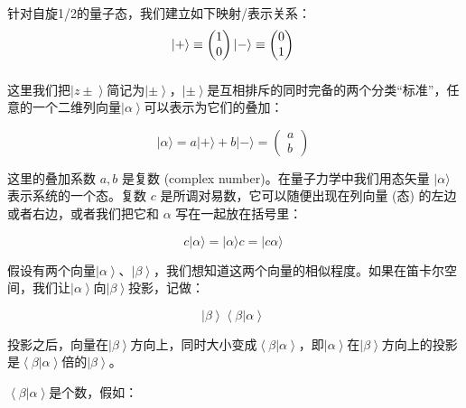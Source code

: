针对自旋1/2的量子态，我们建立如下映射/表示关系：
\begin{equation}
|+\rangle \equiv \begin{pmatrix}1 \\ 0 
\end{pmatrix}\qquad \\\\ 
|-\rangle \equiv \begin{pmatrix}0\\1
\end{pmatrix}~
\end{equation}
\begin{equation}
\end{equation}

这里我们把$\left| z \pm \right\rangle$简记为$\left| \pm \right\rangle$，$\left| \pm \right\rangle$是互相排斥的同时完备的两个分类“标准”，任意的一个二维列向量$\left| \alpha \right\rangle$可以表示为它们的叠加：

\begin{equation}
|\alpha\rangle = a|+\rangle + b|-\rangle = \begin{pmatrix}
a \\ b \end{pmatrix}~
\end{equation}

这里的叠加系数 $a, b$ 是复数 (complex number)。在量子力学中我们用态矢量 $|\alpha\rangle$ 表示系统的一个态。复数 $c$ 是所调对易数，它可以随便出现在列向量 (态) 的左边或者右边，或者我们把它和 $\alpha$ 写在一起放在括号里：

\begin{equation}
c|\alpha\rangle = |\alpha\rangle c = |c\alpha\rangle~
\end{equation}

假设有两个向量$\left|  \alpha \right\rangle$、$\left| \beta \right\rangle$，我们想知道这两个向量的相似程度。如果在笛卡尔空间，我们让$\left|  \alpha \right\rangle$向$\left|  \beta \right\rangle$投影，记做：

\begin{equation}
\left|  \beta \right\rangle \left\langle \beta | \alpha  \right\rangle~
\end{equation}

投影之后，向量在$\left| \beta \right\rangle$方向上，同时大小变成$\left\langle \beta | \alpha  \right\rangle$，即$\left| \alpha \right\rangle$在$\left| \beta \right\rangle$方向上的投影是$\left\langle \beta | \alpha  \right\rangle$倍的$\left| \beta \right\rangle$。

$\left\langle \beta | \alpha  \right\rangle$是个数，假如：

